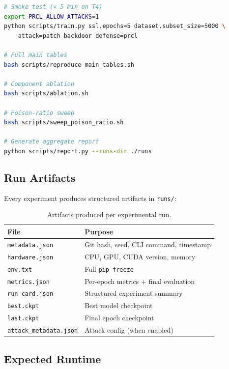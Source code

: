 \documentclass[11pt,a4paper]{article}
\begin{document}
\begin{lstlisting}[language=bash]
# Smoke test (< 5 min on T4)
export PRCL_ALLOW_ATTACKS=1
python scripts/train.py ssl.epochs=5 dataset.subset_size=5000 \
    attack=patch_backdoor defense=prcl

# Full main tables
bash scripts/reproduce_main_tables.sh

# Component ablation
bash scripts/ablation.sh

# Poison-ratio sweep
bash scripts/sweep_poison_ratio.sh

# Generate aggregate report
python scripts/report.py --runs-dir ./runs
\end{lstlisting}

\subsection{Run Artifacts}

Every experiment produces structured artifacts in \texttt{runs/}:

\begin{table}[h]
\centering
\caption{Artifacts produced per experimental run.}
\begin{tabular}{@{}ll@{}}
\toprule
\textbf{File} & \textbf{Purpose} \\
\midrule
\texttt{metadata.json} & Git hash, seed, CLI command, timestamp \\
\texttt{hardware.json} & CPU, GPU, CUDA version, memory \\
\texttt{env.txt}       & Full \texttt{pip freeze} \\
\texttt{metrics.json}  & Per-epoch metrics + final evaluation \\
\texttt{run\_card.json} & Structured experiment summary \\
\texttt{best.ckpt}     & Best model checkpoint \\
\texttt{last.ckpt}     & Final epoch checkpoint \\
\texttt{attack\_metadata.json} & Attack config (when enabled) \\
\bottomrule
\end{tabular}
\end{table}

\subsection{Expected Runtime}
\end{document}
